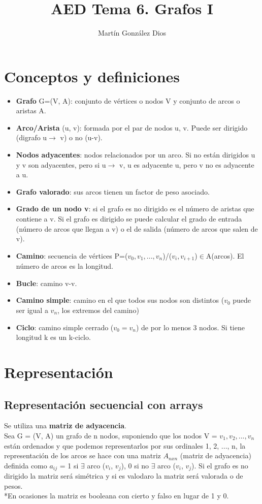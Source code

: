 \documentclass{article}
\title{AED Tema 6. Grafos I}
\author{Martín González Dios}
\begin{document}
\maketitle

\section{Conceptos y definiciones}
\begin{itemize}
    \item \textbf{Grafo} G=(V, A): conjunto de vértices o nodos V y conjunto de arcos o aristas A.
    \item \textbf{Arco/Arista} (u, v): formada por el par de nodos u, v. Puede ser dirigido (digrafo u$\rightarrow$ v) o no (u-v).
    \item \textbf{Nodos adyacentes}: nodos relacionados por un arco. Si no están dirigidos u y v son adyacentes, pero si u$\rightarrow$ v, u es adyacente u, pero v no es adyacente a u. 
    \item \textbf{Grafo valorado}: sus arcos tienen un factor de peso asociado.
    \item \textbf{Grado de un nodo v}: si el grafo es no dirigido es el número de aristas que contiene a v. Si el grafo es dirigido se puede calcular el grado de entrada (número de arcos que llegan a v) o el de salida (número de arcos que salen de v).
    \item \textbf{Camino}: secuencia de vértices P=($v_0, v_1, ..., v_n$)/($v_i, v_{i+1}$)$\in$A(arcos). El número de arcos es la longitud. 
    \item \textbf{Bucle}: camino v-v.
    \item \textbf{Camino simple}: camino en el que todos sus nodos son distintos ($v_0$ puede ser igual a $v_n$, los extremos del camino) 
    \item \textbf{Ciclo}: camino simple cerrado ($v_0=v_n$) de por lo menos 3 nodos. Si tiene longitud k es un k-ciclo.
\end{itemize}

\section{Representación}
\subsection{Representación secuencial con arrays}
Se utiliza una \textbf{matriz de adyacencia}. \\
Sea G = (V, A) un grafo de n nodos, suponiendo que los nodos V = {$v_1, v_2, ..., v_n$} están ordenados y que podemos representarlos por sus ordinales {1, 2, ..., n}, la representación de los arcos se hace con una matriz $A_{nxn}$ (matriz de adyacencia) definida como $a_{ij}$ = {1 si $\exists$ arco ($v_i$, $v_j$), 0 si no $\exists$ arco ($v_i$, $v_j$)}. Si el grafo es no dirigido la matriz será simétrica y si es valodaro la matriz será valorada o de pesos. \\
*En ocasiones la matriz es booleana con cierto y falso en lugar de 1 y 0. \\
\end{document}
